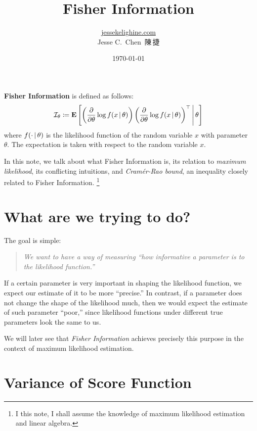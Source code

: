 \documentclass[a4paper]{article}
\title{Fisher Information}
\author{\href{https://jessekelighine.com}{jessekelighine.com}\\Jesse C.\ Chen\ 陳\,捷}
\date{\today}
\begin{document}
\maketitle

\noindent
\textbf{Fisher Information} is defined as follows:
\begin{align*}
	\mathcal{I}_{\theta}
	\coloneqq
	\E
	\left[
	\left(
	\frac{\partial}{\partial\theta}\log f(x\given\theta)
	\right)
	\left(
	\frac{\partial}{\partial\theta}\log f(x\given\theta)
	\right)\T
	\given[\middle]
	\theta
	\right]
\end{align*}
where $f(\cdot\given\theta)$ is the likelihood function of the random variable $x$ with parameter $\theta$.
The expectation is taken with respect to the random variable $x$.

In this note,
we talk about what Fisher Information is,
its relation to \emph{maximum likelihood},
its conflicting intuitions,
and \emph{Cramér-Rao bound}, an inequality closely related to Fisher Information.
\footnote{
	I this note, I shall assume the knowledge of maximum likelihood estimation and linear algebra.
}

\section{What are we trying to do?}

The goal is simple:
\begin{quote}
	\textit{We want to have a way of measuring ``how informative a parameter is to the likelihood function.''}
\end{quote}
If a certain parameter is very important in shaping the likelihood function,
we expect our estimate of it to be more ``precise.''
In contrast, if a parameter does not change the shape of the likelihood much,
then we would expect the estimate of such parameter ``poor,''
since likelihood functions under different true parameters look the same to us.

We will later see that \emph{Fisher Information} achieves precisely this purpose
in the context of maximum likelihood estimation.

\section{Variance of Score Function}
\end{document}

